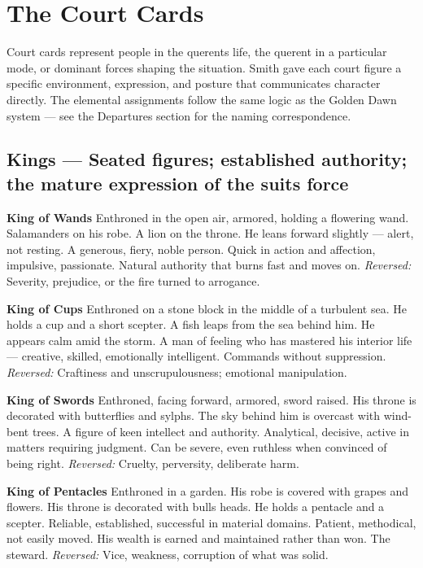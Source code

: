 \section{The Court Cards}\label{the-court-cards}

Court cards represent people in the querent\textquotesingle s life, the querent in a particular mode, or dominant forces shaping the situation. Smith gave each court figure a specific environment, expression, and posture that communicates character directly. The elemental assignments follow the same logic as the Golden Dawn system --- see the Departures section for the naming correspondence.

\subsection{Kings --- Seated figures; established authority; the mature expression of the suit\textquotesingle s force}\label{kings--seated-figures-established-authority-the-mature-expression-of-the-suits-force}

\textbf{King of Wands} Enthroned in the open air, armored, holding a flowering wand. Salamanders on his robe. A lion on the throne. He leans forward slightly --- alert, not resting. A generous, fiery, noble person. Quick in action and affection, impulsive, passionate. Natural authority that burns fast and moves on. \emph{Reversed:} Severity, prejudice, or the fire turned to arrogance.

\textbf{King of Cups} Enthroned on a stone block in the middle of a turbulent sea. He holds a cup and a short scepter. A fish leaps from the sea behind him. He appears calm amid the storm. A man of feeling who has mastered his interior life --- creative, skilled, emotionally intelligent. Commands without suppression. \emph{Reversed:} Craftiness and unscrupulousness; emotional manipulation.

\textbf{King of Swords} Enthroned, facing forward, armored, sword raised. His throne is decorated with butterflies and sylphs. The sky behind him is overcast with wind-bent trees. A figure of keen intellect and authority. Analytical, decisive, active in matters requiring judgment. Can be severe, even ruthless when convinced of being right. \emph{Reversed:} Cruelty, perversity, deliberate harm.

\textbf{King of Pentacles} Enthroned in a garden. His robe is covered with grapes and flowers. His throne is decorated with bulls\textquotesingle{} heads. He holds a pentacle and a scepter. Reliable, established, successful in material domains. Patient, methodical, not easily moved. His wealth is earned and maintained rather than won. The steward. \emph{Reversed:} Vice, weakness, corruption of what was solid.

